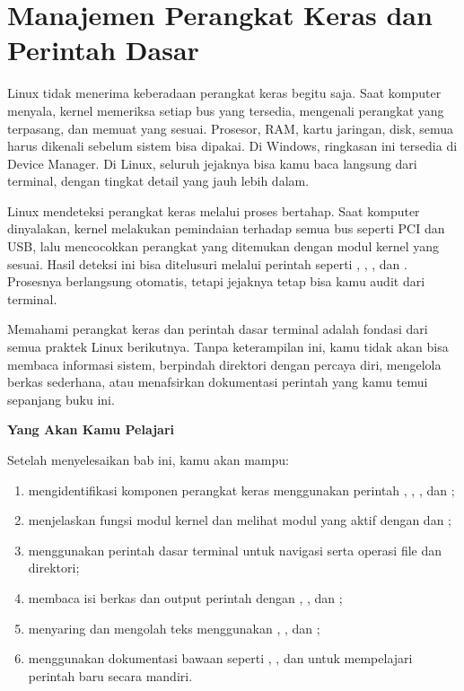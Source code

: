 
\chapter{Manajemen Perangkat Keras dan Perintah Dasar}
\label{ch:hardware-and-basic-commands}


Linux tidak menerima keberadaan perangkat keras begitu saja. Saat komputer menyala,
kernel memeriksa setiap bus yang tersedia, mengenali perangkat yang terpasang, dan
memuat  yang sesuai. Prosesor, RAM, kartu jaringan, disk, semua harus
dikenali sebelum sistem bisa dipakai. Di Windows, ringkasan ini tersedia di Device
Manager. Di Linux, seluruh jejaknya bisa kamu baca langsung dari terminal, dengan
tingkat detail yang jauh lebih dalam.

Linux mendeteksi perangkat keras melalui proses bertahap. Saat komputer dinyalakan, kernel melakukan pemindaian terhadap semua bus seperti PCI dan USB, lalu mencocokkan perangkat yang ditemukan dengan modul kernel yang sesuai. Hasil deteksi ini bisa ditelusuri melalui perintah seperti , , , dan . Prosesnya berlangsung otomatis, tetapi jejaknya tetap bisa kamu audit dari terminal.

Memahami perangkat keras dan perintah dasar terminal adalah fondasi dari semua praktek Linux berikutnya. Tanpa keterampilan ini, kamu tidak akan bisa membaca informasi sistem, berpindah direktori dengan percaya diri, mengelola berkas sederhana, atau menafsirkan dokumentasi perintah yang kamu temui sepanjang buku ini.

\textbf{Yang Akan Kamu Pelajari}

Setelah menyelesaikan bab ini, kamu akan mampu:

\begin{enumerate}
    \item mengidentifikasi komponen perangkat keras menggunakan perintah , , , dan ;
    \item menjelaskan fungsi modul kernel dan melihat modul yang aktif dengan  dan ;
    \item menggunakan perintah dasar terminal untuk navigasi serta operasi file dan direktori;
    \item membaca isi berkas dan output perintah dengan , , dan ;
    \item menyaring dan mengolah teks menggunakan , , dan ;
    \item menggunakan dokumentasi bawaan seperti , , dan  untuk mempelajari perintah baru secara mandiri.
\end{enumerate}

